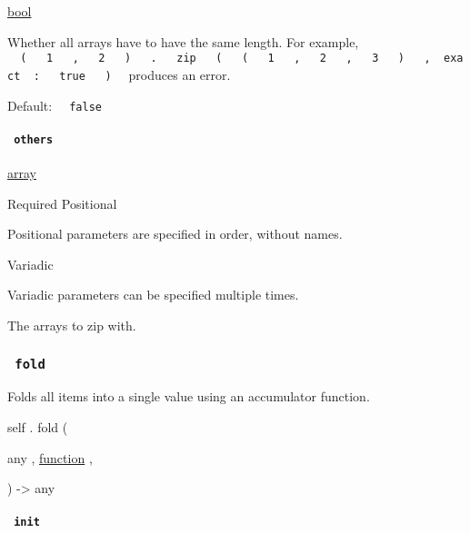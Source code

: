 \href{/docs/reference/foundations/bool/}{bool}

Whether all arrays have to have the same length. For example,
\texttt{\ }{\texttt{\ (\ }}\texttt{\ }{\texttt{\ 1\ }}\texttt{\ }{\texttt{\ ,\ }}\texttt{\ }{\texttt{\ 2\ }}\texttt{\ }{\texttt{\ )\ }}\texttt{\ }{\texttt{\ .\ }}\texttt{\ }{\texttt{\ zip\ }}\texttt{\ }{\texttt{\ (\ }}\texttt{\ }{\texttt{\ (\ }}\texttt{\ }{\texttt{\ 1\ }}\texttt{\ }{\texttt{\ ,\ }}\texttt{\ }{\texttt{\ 2\ }}\texttt{\ }{\texttt{\ ,\ }}\texttt{\ }{\texttt{\ 3\ }}\texttt{\ }{\texttt{\ )\ }}\texttt{\ }{\texttt{\ ,\ }}\texttt{\ exact\ }{\texttt{\ :\ }}\texttt{\ }{\texttt{\ true\ }}\texttt{\ }{\texttt{\ )\ }}\texttt{\ }
produces an error.

Default: \texttt{\ }{\texttt{\ false\ }}\texttt{\ }

\paragraph{\texorpdfstring{\texttt{\ others\ }}{ others }}\label{definitions-zip-others}

\href{/docs/reference/foundations/array/}{array}

{Required} {{ Positional }}

\label{definitions-zip-others-positional-tooltip}
Positional parameters are specified in order, without names.

{{ Variadic }}

\label{definitions-zip-others-variadic-tooltip}
Variadic parameters can be specified multiple times.

The arrays to zip with.

\subsubsection{\texorpdfstring{\texttt{\ fold\ }}{ fold }}\label{definitions-fold}

Folds all items into a single value using an accumulator function.

self { . } { fold } (

{ { any } , } { \href{/docs/reference/foundations/function/}{function} ,
}

) -\textgreater{} { any }

\paragraph{\texorpdfstring{\texttt{\ init\ }}{ init }}\label{definitions-fold-init}

